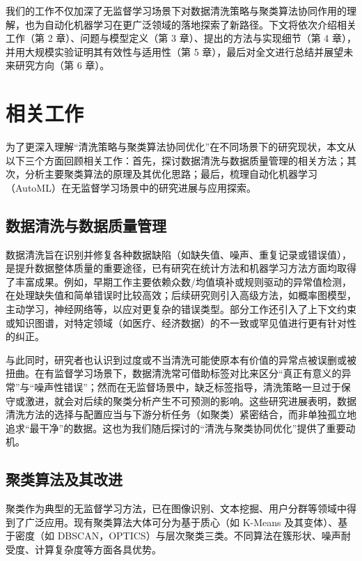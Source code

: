 \documentclass[10pt]{article} %
\numberwithin{equation}{section}
\begin{document}
我们的工作不仅加深了无监督学习场景下对数据清洗策略与聚类算法协同作用的理解，也为自动化机器学习在更广泛领域的落地探索了新路径。下文将依次介绍相关工作（第 2 章）、问题与模型定义（第 3 章）、提出的方法与实现细节（第 4 章），并用大规模实验证明其有效性与适用性（第 5 章），最后对全文进行总结并展望未来研究方向（第 6 章）。



\section{相关工作}\label{sec:related_work}

为了更深入理解“清洗策略与聚类算法协同优化”在不同场景下的研究现状，本文从以下三个方面回顾相关工作：首先，探讨数据清洗与数据质量管理的相关方法；其次，分析主要聚类算法的原理及其优化思路；最后，梳理自动化机器学习（AutoML）在无监督学习场景中的研究进展与应用探索。

\subsection{数据清洗与数据质量管理}
数据清洗旨在识别并修复各种数据缺陷（如缺失值、噪声、重复记录或错误值），是提升数据整体质量的重要途径，已有研究在统计方法和机器学习方法方面均取得了丰富成果。例如，早期工作主要依赖众数/均值填补\cite{10.1093/bioinformatics/btr597}或规则驱动的异常值检测\cite{6544854, 5767833}，在处理缺失值和简单错误时比较高效；后续研究则引入高级方法，如概率图模型\cite{9151362}，主动学习\cite{10.14778/2994509.2994514, 10.1145/3357384.3358129}，神经网络\cite{Krishnan2017}等，以应对更复杂的错误类型。部分工作还引入了上下文约束或知识图谱\cite{6544847,10.14778/3407790.3407801}，对特定领域（如医疗、经济数据）的不一致或罕见值进行更有针对性的纠正。

与此同时，研究者也认识到过度或不当清洗可能使原本有价值的异常点被误删或被扭曲\cite{Ni2023}。在有监督学习场景下，数据清洗常可借助标签对比来区分“真正有意义的异常”与“噪声性错误”\cite{Bernhardt2022}；然而在无监督场景中，缺乏标签指导，清洗策略一旦过于保守或激进，就会对后续的聚类分析产生不可预测的影响。这些研究进展表明，数据清洗方法的选择与配置应当与下游分析任务（如聚类）紧密结合，而非单独孤立地追求“最干净”的数据\cite{Hu2017}。这也为我们随后探讨的“清洗与聚类协同优化”提供了重要动机。

\subsection{聚类算法及其改进}
聚类作为典型的无监督学习方法，已在图像识别、文本挖掘、用户分群等领域中得到了广泛应用。现有聚类算法大体可分为基于质心（如 K-Means 及其变体\cite{Bandyapadhyay2024, HUANG2021107996, IKOTUN2023178}）、基于密度（如 DBSCAN\cite{Abdulhameed2024, CHENG2024120731}，OPTICS\cite{HAJIHOSSEINLOU2024126094, 10.3233/IDA-205497, KAMIL20232625}）与层次聚类\cite{CHEN2025125714}三类。不同算法在簇形状、噪声耐受度、计算复杂度等方面各具优势\cite{SINGH2024102799}。
\end{document}
